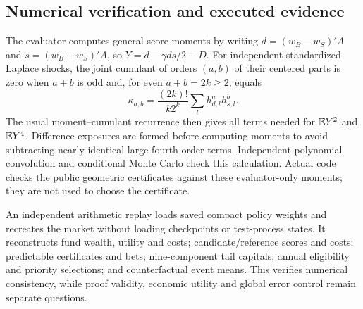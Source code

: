 \subsection{Numerical verification and executed evidence}
The evaluator computes general score moments by writing
$d=(w_B-w_S)'A$ and $s=(w_B+w_S)'A$, so
$Y=d-\gamma ds/2-D$. For independent standardized Laplace shocks, the joint
cumulant of orders $(a,b)$ of their centered parts is zero when $a+b$ is odd
and, for even $a+b=2k\ge2$, equals
\[
 \kappa_{a,b}=\frac{(2k)!}{k2^k}
       \sum_l h_{d,l}^{a}h_{s,l}^{b}.
\]
The usual moment--cumulant recurrence then gives all terms needed for
$\mathbb E Y^2$ and $\mathbb E Y^4$. Difference exposures are formed before computing
moments to avoid subtracting nearly identical large fourth-order terms.
Independent polynomial convolution and conditional Monte Carlo check this
calculation. Actual code checks the public geometric certificates against
these evaluator-only moments; they are not used to choose the certificate.

An independent arithmetic replay loads saved compact policy weights and
recreates the market without loading checkpoints or test-process states.
It reconstructs fund wealth, utility and costs; candidate/reference scores
and costs; predictable certificates and bets; nine-component tail capitals;
annual eligibility and priority selections; and counterfactual event means.
This verifies numerical consistency, while proof validity, economic utility
and global error control remain separate questions.

\FloatBarrier
